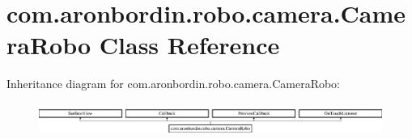 \hypertarget{classcom_1_1aronbordin_1_1robo_1_1camera_1_1CameraRobo}{\section{com.\+aronbordin.\+robo.\+camera.\+Camera\+Robo Class Reference}
\label{classcom_1_1aronbordin_1_1robo_1_1camera_1_1CameraRobo}
}
Inheritance diagram for com.\+aronbordin.\+robo.\+camera.\+Camera\+Robo\+:\begin{figure}[H]
\begin{center}
\leavevmode
\includegraphics[height=1.068702cm]{d6/dc1/classcom_1_1aronbordin_1_1robo_1_1camera_1_1CameraRobo}
\end{center}
\end{figure}
